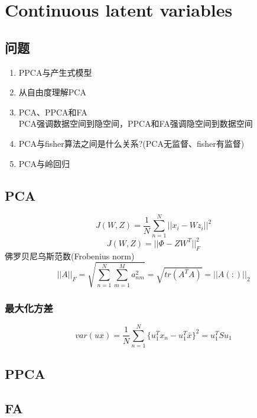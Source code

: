 \chapter{Continuous latent variables}
\section{问题}
\begin{enumerate}
\item PPCA与产生式模型
\item 从自由度理解PCA
\item PCA、PPCA和FA\\
PCA强调数据空间到隐空间，PPCA和FA强调隐空间到数据空间
\item PCA与fisher算法之间是什么关系?(PCA无监督、fisher有监督)
\item PCA与岭回归
\end{enumerate}
\section{PCA}
\begin{equation}
J(W,Z) = \frac{1}{N}\sum_{n=1}^N||x_i - Wz_i||^2
\end{equation}
\begin{equation}
J(W,Z) = ||\Phi - ZW^T||^2_F
\end{equation}
佛罗贝尼乌斯范数(Frobenius norm)
\begin{equation}
||A||_F = \sqrt{\sum_{n=1}^N\sum_{m=1}^Ma_{nm}^{2}} = \sqrt{tr(A^TA)}
 = ||A(:)||_2
\end{equation}

\subsection{最大化方差}
\begin{equation}
var(ux) = \frac{1}{N}
\sum_{n=1}^N\{u_1^Tx_n - u_1^T\bar{x}\}^2 = u_1^TSu_1
\end{equation}
\section{PPCA}
\section{FA}
